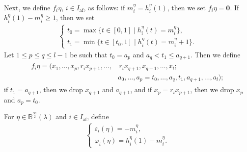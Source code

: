 \documentclass[ALCO,ThmDefs,Unicode,epreuves]{cedram}
\newcommand\bm[1]{\boldsymbol{#1}}
\newcommand{\si}{\frac{\infty}{2}}
\DeclareMathOperator{\af}{af}
\begin{document}
Next, we define $f_i \eta$, $i \in I_{\af}$, as follows: 
if $m_i^{\eta} = h_i^{\eta}(1)$, then we set $f_i \eta = \bm{0}$. 
If $h_i^{\eta}(1) - m_i^{\eta} \geq 1$, then we set
\begin{align} \label{eq:f_i-t}
\begin{cases}
t_0 = \max \{ t \in [0,1] \mid h_i^{\eta}(t) = m_i^{\eta} \} , \\%
t_1 = \min \{ t \in [t_0,1] \mid h_i^{\eta}(t) = m_i^{\eta} + 1 \} .
\end{cases}
\end{align}
Let 
$1 \leq p \leq q \leq l-1$
be such that
$t_0 = a_p$ and $a_q < t_1 \leq a_{q+1}$. 
Then we define
\begin{align}
\begin{split}
f_i \eta 
= 
(x_1 , \ldots , x_p , r_i x_{p+1} , \ldots , 
& \, r_i x_{q+1} , x_{q+1} , \ldots , x_l ; \\ 
&a_0 , \ldots , a_p = t_0 , \ldots , a_q , t_1 , a_{q+1} , \ldots , a_l ) ;
\end{split}
\end{align}
if $t_1 = a_{q+1}$, 
then we drop $x_{q+1}$ and $a_{q+1}$, 
and if $x_p = r_i x_{p+1}$, 
then we drop $x_p$ and $a_p = t_0$.

For $\eta \in \mathbb{B}^{\si}(\lambda)$ and $i \in I_{\af}$, define
\begin{align} \label{eq:path-eps-phi}
\begin{cases}
\varepsilon_i(\eta) = -m_i^{\eta} , \\%
\varphi_i(\eta) = h_i^{\eta}(1) - m_i^{\eta} .
\end{cases}
\end{align}
\end{document}

